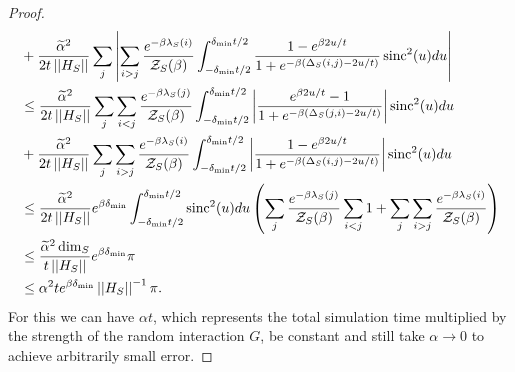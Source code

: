 \begin{proof}
\begin{align}
        &+ \frac{\widetilde{\alpha}^2}{2 t \left| \left| H_S \right| \right|} \sum_j  \left| \sum_{i > j} \frac{e^{-\beta \lambda_S(i)}}{\mathcal{Z}_S(\beta)} \int_{-\delta_{\min} t /2 }^{\delta_{\min} t/ 2} \frac{1 - e^{\beta 2 u / t}}{1 + e^{-\beta(\Delta_S(i,j) - 2u/t)}} \operatorname{sinc}^2(u) du \right| \\
        &\le \frac{\widetilde{\alpha}^2}{2 t \left| \left| H_S \right| \right|} \sum_j \sum_{i < j} \frac{e^{-\beta \lambda_S(j)}}{\mathcal{Z}_S(\beta)} \int_{-\delta_{\min} t /2 }^{\delta_{\min} t/ 2}\left|  \frac{ e^{\beta 2 u / t} - 1}{1 + e^{-\beta(\Delta_S(j, i) - 2u/t)}} \right| \operatorname{sinc}^2(u) du \nonumber \\
        &+ \frac{\widetilde{\alpha}^2}{2 t \left| \left| H_S \right| \right|} \sum_j  \sum_{i > j} \frac{e^{-\beta \lambda_S(i)}}{\mathcal{Z}_S(\beta)} \int_{-\delta_{\min} t /2 }^{\delta_{\min} t/ 2} \left|  \frac{1 - e^{\beta 2 u / t}}{1 + e^{-\beta(\Delta_S(i,j) - 2u/t)}}  \right| \operatorname{sinc}^2(u) du \\
        &\le \frac{\widetilde{\alpha}^2}{2 t \left| \left| H_S \right| \right|} e^{\beta \delta_{\min}} \int_{-\delta_{\min}t/2}^{\delta_{\min}t /2} \operatorname{sinc}^2(u) du \left(\sum_j \frac{e^{-\beta \lambda_S(j)}}{\mathcal{Z}_S(\beta)} \sum_{i < j} 1 + \sum_j \sum_{i > j} \frac{e^{-\beta \lambda_S(i)}}{\mathcal{Z}_S(\beta)}  \right) \\
        &\le \frac{\widetilde{\alpha}^2 \dim_S}{t \left| \left| H_S \right| \right|} e^{\beta \delta_{\min}} \pi \\
        &\le \alpha^2 t e^{\beta \delta_{\min}} \left| \left| H_S \right| \right|^{-1} \pi.
    \end{align}
    For this we can have $\alpha t$, which represents the total simulation time multiplied by the strength of the random interaction $G$, be constant and still take $\alpha \to 0$ to achieve arbitrarily small error.


\end{proof}
